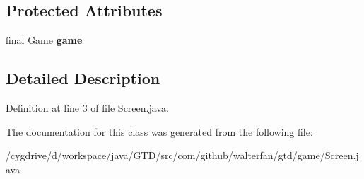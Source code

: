 \subsection*{Protected Attributes}
\begin{DoxyCompactItemize}
\item 
\hypertarget{classcom_1_1github_1_1walterfan_1_1gtd_1_1game_1_1Screen_a46a52c28a126cef2f46cabcfca4ec1e1}{final \hyperlink{interfacecom_1_1github_1_1walterfan_1_1gtd_1_1game_1_1Game}{Game} {\bfseries game}}\label{classcom_1_1github_1_1walterfan_1_1gtd_1_1game_1_1Screen_a46a52c28a126cef2f46cabcfca4ec1e1}

\end{DoxyCompactItemize}


\subsection{Detailed Description}


Definition at line 3 of file Screen.\-java.



The documentation for this class was generated from the following file\-:\begin{DoxyCompactItemize}
\item 
/cygdrive/d/workspace/java/\-G\-T\-D/src/com/github/walterfan/gtd/game/Screen.\-java\end{DoxyCompactItemize}
